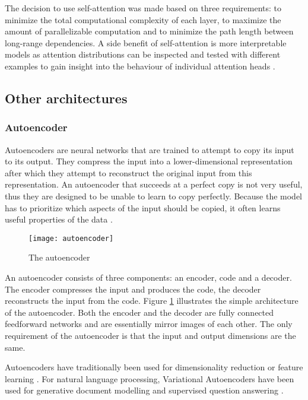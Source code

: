 The decision to use self-attention was made based on three requirements: to minimize the total computational complexity of each layer, to maximize the amount of parallelizable computation and to minimize the path length between long-range dependencies.
A side benefit of self-attention is more interpretable models as attention distributions can be inspected and tested with different examples to gain insight into the behaviour of individual attention heads \cite{vaswani2017}.

\subsection{Other architectures} \label{Other architectures}
\subsubsection{Autoencoder}\label{Autoencoder}
Autoencoders are neural networks that are trained to attempt to copy its input to its output.
They compress the input into a lower-dimensional representation after which they attempt to reconstruct the original input from this representation.
An autoencoder that succeeds at a perfect copy is not very useful, thus they are designed to be unable to learn to copy perfectly.
Because the model has to prioritize which aspects of the input should be copied, it often learns useful properties of the data \cite{goodfellow2016}.


\begin{figure}[t]
\texttt{[image: autoencoder]}
\centering
\caption{The autoencoder}
\label{fig:autoencoder}
\end{figure}

An autoencoder consists of three components: an encoder, code and a decoder.
The encoder compresses the input and produces the code, the decoder reconstructs the input from the code.
Figure \ref{fig:autoencoder} illustrates the simple architecture of the autoencoder.
Both the encoder and the decoder are fully connected feedforward networks and are essentially mirror images of each other.
The only requirement of the autoencoder is that the input and output dimensions are the same.

Autoencoders have traditionally been used for dimensionality reduction or feature learning \cite{goodfellow2016}.
For natural language processing, Variational Autoencoders \cite{kingma2014} have been used for generative document modelling and supervised question answering \cite{miao2016}.




